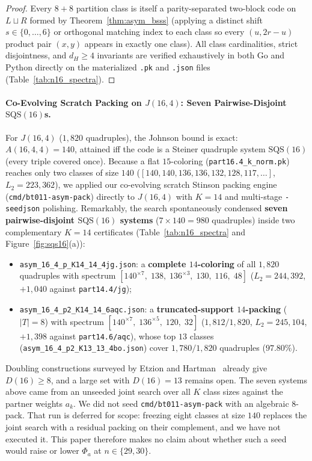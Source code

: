 \documentclass[11pt,letterpaper]{article}
\theoremstyle{plain}
\theoremstyle{definition}
\theoremstyle{remark}
\begin{document}
\begin{proof}
Every $8{+}8$ partition class is itself a parity-separated two-block code on $L \sqcup R$ formed by Theorem~\ref{thm:asym_bsss} (applying a distinct shift $s \in \{0, \dots, 6\}$ or orthogonal matching index to each class so every $(u, 2r-u)$ product pair $(x, y)$ appears in exactly one class). All class cardinalities, strict disjointness, and $d_H \ge 4$ invariants are verified exhaustively in both Go and Python directly on the materialized \texttt{.pk} and \texttt{.json} files (Table~\ref{tab:n16_spectra}).
\end{proof}

\paragraph{Co-Evolving Scratch Packing on $J(16, 4)$: Seven Pairwise-Disjoint $\mathrm{SQS}(16)$s.}
For $J(16, 4)$ ($1{,}820$ quadruples), the Johnson bound is exact: $A(16, 4, 4) = 140$, attained iff the code is a Steiner quadruple system $\mathrm{SQS}(16)$ (every triple covered once). Because a flat $15$-coloring (\texttt{part16.4\_k\_norm.pk}) reaches only two classes of size $140$ ($[140, 140, 136, 136, 132, 128, 117, \dots]$, $L_2 = 223{,}362$), we applied our co-evolving scratch Stinson packing engine (\texttt{cmd/bt011-asym-pack}) directly to $J(16, 4)$ with $K = 14$ and multi-stage \texttt{-seedjson} polishing. Remarkably, the search spontaneously condensed \textbf{seven pairwise-disjoint $\mathrm{SQS}(16)$ systems} ($7 \times 140 = 980$ quadruples) inside two complementary $K = 14$ certificates (Table~\ref{tab:n16_spectra} and Figure~\ref{fig:sqs16}(a)):
\begin{itemize}[leftmargin=1.5em,itemsep=1pt]
    \item \texttt{asym\_16\_4\_p\_K14\_14\_4jg.json}: a \textbf{complete $14$-coloring} of all $1{,}820$ quadruples with spectrum $[140^{\times 7},\; 138,\; 136^{\times 3},\; 130,\; 116,\; 48]$ ($L_2 = 244{,}392$, $+1{,}040$ against \texttt{part14.4/jg});
    \item \texttt{asym\_16\_4\_p2\_K14\_14\_6aqc.json}: a \textbf{truncated-support $14$-packing} ($|T| = 8$) with spectrum $[140^{\times 7},\; 136^{\times 5},\; 120,\; 32]$ ($1{,}812/1{,}820$, $L_2 = 245{,}104$, $+1{,}398$ against \texttt{part14.6/aqc}), whose top $13$ classes (\texttt{asym\_16\_4\_p2\_K13\_13\_4bo.json}) cover $1{,}780/1{,}820$ quadruples ($97.80\%$).
\end{itemize}
Doubling constructions surveyed by Etzion and Hartman~\cite{EtzionHartman1991} already give $D(16) \ge 8$, and a large set with $D(16) = 13$ remains open. The seven systems above came from an unseeded joint search over all $K$ class sizes against the partner weights $a_k$. We did not seed \texttt{cmd/bt011-asym-pack} with an algebraic $8$-pack. That run is deferred for scope: freezing eight classes at size $140$ replaces the joint search with a residual packing on their complement, and we have not executed it. This paper therefore makes no claim about whether such a seed would raise or lower $\Phi_a$ at $n \in \{29, 30\}$.
\end{document}
